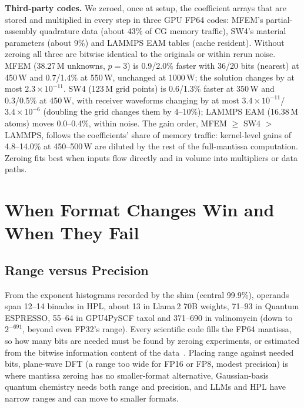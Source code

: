 \documentclass[conference]{IEEEtran}
\newcommand{\W}{\,W}
\newcommand{\ee}[2]{#1{\times}10^{#2}}  %
\newcommand{\pct}{\%}
\begin{document}
\textbf{Third-party codes.} We zeroed, once at setup, the coefficient arrays that are stored and multiplied in every
step in three GPU FP64 codes: MFEM's partial-assembly quadrature data (about 43\pct{} of CG memory traffic), SW4's
material parameters (about 9\pct) and LAMMPS EAM tables (cache resident). Without zeroing all three are bitwise
identical to the originals or within rerun noise. MFEM (38.27\,M unknowns, $p=3$) is 0.9/2.0\pct{} faster with
36/20 bits (nearest) at 450\W{} and 0.7/1.4\pct{} at 550\W, unchanged at 1000\W; the solution changes by at most
$\ee{2.3}{-11}$. SW4 (123\,M grid points) is 0.6/1.3\pct{} faster at 350\W{} and 0.3/0.5\pct{} at 450\W{}, with
receiver waveforms changing by at most $\ee{3.4}{-11}$/$\ee{3.4}{-6}$ (doubling the grid changes them by 4--10\pct);
LAMMPS EAM (16.38\,M atoms) moves 0.0--0.4\pct, within noise. The gain order, MFEM $\ge$ SW4 $>$ LAMMPS, follows
the coefficients' share of memory traffic: kernel-level gains of 4.8--14.0\pct{} at 450--500\W{} are diluted by the rest of the
full-mantissa computation. Zeroing fits best when inputs flow directly and in volume into multipliers or data
paths.

\section{When Format Changes Win and When They Fail}\label{sec:format}

\subsection{Range versus Precision}\label{sec:range}

From the exponent histograms recorded by the shim (central 99.9\pct), operands span 12--14 binades in HPL, about 13
in Llama\,2 70B weights, 71--93 in Quantum ESPRESSO, 55--64 in GPU4PySCF taxol and 371--690 in valinomycin (down to
$2^{-691}$, beyond even FP32's range). Every scientific code fills the FP64 mantissa, so how many bits are needed
must be found by zeroing experiments, or estimated from the bitwise information content of the
data~\cite{Klower2021}. Placing range against needed bits, plane-wave DFT (a range too wide for FP16 or FP8, modest
precision) is where mantissa zeroing has no smaller-format alternative, Gaussian-basis quantum chemistry needs both
range and precision, and LLMs and HPL have narrow ranges and can move to smaller formats.
\end{document}
